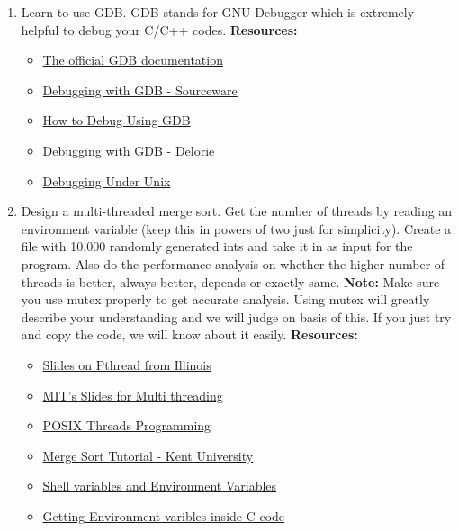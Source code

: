 \documentclass{article}
\begin{document}
\begin{enumerate}
\item Learn to use GDB. GDB stands for GNU Debugger which is extremely helpful to debug your C/C++ codes.{\newline}{\newline}
{\bf Resources:}

    \begin{itemize}
        \item \href{https://www.gnu.org/software/gdb/documentation/}{The official GDB documentation}
        \item \href{https://sourceware.org/gdb/onlinedocs/gdb/}{Debugging with GDB - Sourceware}
        \item \href{http://cs.baylor.edu/~donahoo/tools/gdb/tutorial.html}{How to Debug Using GDB}
        \item \href{http://www.delorie.com/gnu/docs/gdb/gdb_toc.html}{Debugging with GDB - Delorie}
        \item \href{https://www.cs.cmu.edu/~gilpin/tutorial/}{Debugging Under Unix}
    \end{itemize}

\item Design a multi-threaded merge sort. Get the number of threads by reading an environment variable (keep this in powers of two just for simplicity). Create a file with 10,000 randomly generated ints and take it in as input for the program. Also do the performance analysis on whether the higher number of threads is better, always better, depends or exactly same.
{\newline}{\newline}
{\bf Note:}
Make sure you use mutex properly to get accurate analysis. Using mutex will greatly describe your understanding and we will judge on basis of this. If you just try and copy the code, we will know about it easily.{\newline}{\newline}
{\bf Resources:}

    \begin{itemize}
        \item \href{https://courses.engr.illinois.edu/cs241/fa2010/ppt/10-pthread-examples.pdf}{Slides on Pthread from Illinois}
        \item \href{https://ocw.mit.edu/courses/electrical-engineering-and-computer-science/6-087-practical-programming-in-c-january-iap-2010/lecture-notes/MIT6_087IAP10_lec12.pdf}{MIT's Slides for Multi threading}
        \item \href{https://computing.llnl.gov/tutorials/pthreads/}{POSIX Threads Programming}
        \item \href{http://www.personal.kent.edu/~rmuhamma/Algorithms/MyAlgorithms/Sorting/mergeSort.htm}{Merge Sort Tutorial - Kent University}
        \item \href{http://sc.tamu.edu/help/general/unix/vars.html}{Shell variables and Environment Variables}
        \item \href{http://www0.cs.ucl.ac.uk/staff/ucacbbl/getenv/}{Getting Environment varibles inside C code}
    \end{itemize}


\end{enumerate}
\end{document}
